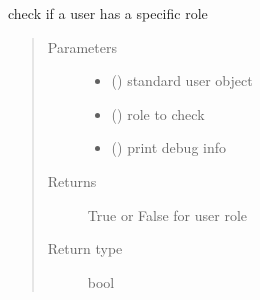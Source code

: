 \documentclass[letterpaper,10pt,english]{sphinxmanual}
\begin{document}
\begin{fulllineitems}
\label{\detokenize{rbac:rbac.core.rbac_user_has_role}}
check if a user has a specific role
\begin{quote}\begin{description}
\item[{Parameters}] \leavevmode\begin{itemize}
\item {} 
 ({\hyperref[\detokenize{accounts:accounts.models.User}]{}}) \textendash{} standard user object

\item {} 
 () \textendash{} role to check

\item {} 
 () \textendash{} print debug info

\end{itemize}

\item[{Returns}] \leavevmode
True or False for user role

\item[{Return type}] \leavevmode
bool

\end{description}\end{quote}

\end{fulllineitems}

\end{document}
